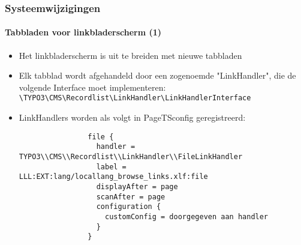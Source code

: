 
\begin{frame}[fragile]
	\frametitle{Systeemwijzigingen}
	\framesubtitle{Tabbladen voor linkbladerscherm (1)}

	\lstset{basicstyle=\tiny\ttfamily}

	\begin{itemize}

		\item Het linkbladerscherm is uit te breiden met nieuwe tabbladen

		\item Elk tabblad wordt afgehandeld door een zogenoemde "LinkHandler", die de volgende Interface
			moet implementeren:\newline
			\small
				\texttt{\textbackslash TYPO3\textbackslash CMS\textbackslash Recordlist\textbackslash LinkHandler\textbackslash LinkHandlerInterface}
			\normalsize

		\item LinkHandlers worden als volgt in PageTSconfig geregistreerd:

			\begin{lstlisting}
				file {
				  handler = TYPO3\\CMS\\Recordlist\\LinkHandler\\FileLinkHandler
				  label = LLL:EXT:lang/locallang_browse_links.xlf:file
				  displayAfter = page
				  scanAfter = page
				  configuration {
				    customConfig = doorgegeven aan handler
				  }
				}
			\end{lstlisting}

	\end{itemize}

\end{frame}


